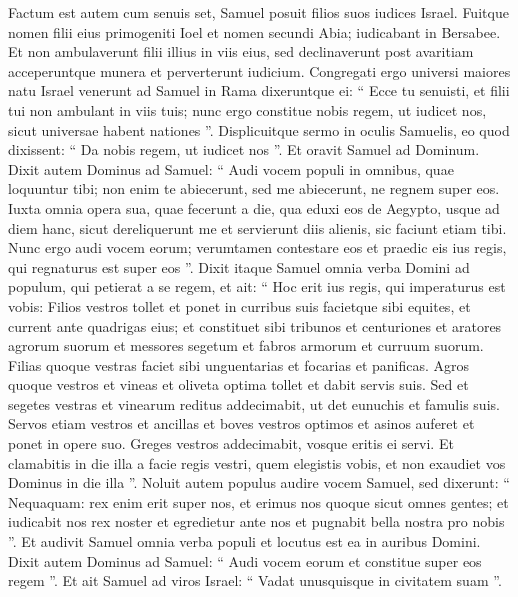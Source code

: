 \begin{biblechapter}
\begin{biblechapter}
\begin{biblechapter}
\begin{biblechapter}
\begin{biblechapter}
\begin{biblechapter}
\begin{biblechapter}
\begin{biblechapter}
\verse Factum est autem cum senuis set, Samuel posuit filios suos iudices Israel. 
\verse Fuitque nomen filii eius primogeniti Ioel et nomen secundi Abia; iudicabant in Bersabee. 
\verse Et non ambulaverunt filii illius in viis eius, sed declinaverunt post avaritiam acceperuntque munera et perverterunt iudicium.
 \verse Congregati ergo universi maiores natu Israel venerunt ad Samuel in Rama 
\verse dixeruntque ei: “ Ecce tu senuisti, et filii tui non ambulant in viis tuis; nunc ergo constitue nobis regem, ut iudicet nos, sicut universae habent nationes ”. 
 \verse Displicuitque sermo in oculis Samuelis, eo quod dixissent: “ Da nobis regem, ut iudicet nos ”. Et oravit Samuel ad Dominum. 
\verse Dixit autem Dominus ad Samuel: “ Audi vocem populi in omnibus, quae loquuntur tibi; non enim te abiecerunt, sed me abiecerunt, ne regnem super eos. 
\verse Iuxta omnia opera sua, quae fecerunt a die, qua eduxi eos de Aegypto, usque ad diem hanc, sicut dereliquerunt me et servierunt diis alienis, sic faciunt etiam tibi. 
\verse Nunc ergo audi vocem eorum; verumtamen contestare eos et praedic eis ius regis, qui regnaturus est super eos ”.
 \verse Dixit itaque Samuel omnia verba Domini ad populum, qui petierat a se regem, 
\verse et ait: “ Hoc erit ius regis, qui imperaturus est vobis: Filios vestros tollet et ponet in curribus suis facietque sibi equites, et current ante quadrigas eius; 
\verse et constituet sibi tribunos et centuriones et aratores agrorum suorum et messores segetum et fabros armorum et curruum suorum. 
\verse Filias quoque vestras faciet sibi unguentarias et focarias et panificas. 
\verse Agros quoque vestros et vineas et oliveta optima tollet et dabit servis suis. 
 \verse Sed et segetes vestras et vinearum reditus addecimabit, ut det eunuchis et famulis suis. 
\verse Servos etiam vestros et ancillas et boves vestros optimos et asinos auferet et ponet in opere suo. 
\verse Greges vestros addecimabit, vosque eritis ei servi. 
\verse Et clamabitis in die illa a facie regis vestri, quem elegistis vobis, et non exaudiet vos Dominus in die illa ”.
 \verse Noluit autem populus audire vocem Samuel, sed dixerunt: “ Nequaquam: rex enim erit super nos, 
\verse et erimus nos quoque sicut omnes gentes; et iudicabit nos rex noster et egredietur ante nos et pugnabit bella nostra pro nobis ”. 
\verse Et audivit Samuel omnia verba populi et locutus est ea in auribus Domini. 
\verse Dixit autem Dominus ad Samuel: “ Audi vocem eorum et constitue super eos regem ”. Et ait Samuel ad viros Israel: “ Vadat unusquisque in civitatem suam ”.
 

\end{biblechapter}
\end{biblechapter}
\end{biblechapter}
\end{biblechapter}
\end{biblechapter}
\end{biblechapter}
\end{biblechapter}
\end{biblechapter}

